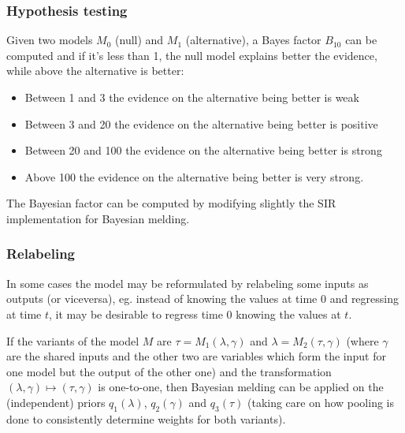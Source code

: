 \documentclass[aspectratio=43]{beamer}
\begin{document}
\begin{frame}
	\frametitle{Hypothesis testing}
	Given two models $M_0$ (null) and $M_1$ (alternative), a Bayes factor $B_{10}$ can be computed and if it's less than 1, the null model explains better the evidence, while above the alternative is better:
	\begin{itemize}
		\item Between 1 and 3 the evidence on the alternative being better is weak
		\item Between 3 and 20 the evidence on the alternative being better is positive
		\item Between 20 and 100 the evidence on the alternative being better is strong
		\item Above 100 the evidence on the alternative being better is very strong.
	\end{itemize}

	The Bayesian factor can be computed by modifying slightly the SIR implementation for Bayesian melding.
\end{frame}

\begin{frame}
	\frametitle{Relabeling}
	In some cases the model may be reformulated by relabeling some inputs as outputs (or viceversa), eg. instead of knowing the values at time $0$ and regressing at time $t$, it may be desirable to regress time $0$ knowing the values at $t$.
	
	If the variants of the model $M$ are $\tau = M_1(\lambda, \gamma)$ and $\lambda = M_2(\tau, \gamma)$ (where $\gamma$ are the shared inputs and the other two are variables which form the input for one model but the output of the other one) and the transformation $(\lambda, \gamma) \mapsto (\tau, \gamma)$ is one-to-one, then Bayesian melding can be applied on the (independent) priors $q_1(\lambda)$, $q_2(\gamma)$ and $q_3(\tau)$ (taking care on how pooling is done to consistently determine weights for both variants).
\end{frame}
\end{document}

